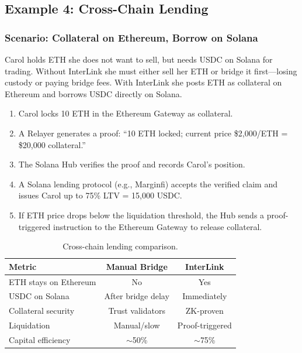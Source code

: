 \documentclass[11pt,a4paper]{article}
\begin{document}
\subsection{Example 4: Cross-Chain Lending}

\subsubsection{Scenario: Collateral on Ethereum, Borrow on Solana}

Carol holds ETH she does not want to sell, but needs USDC on Solana for trading. Without InterLink she must either sell her ETH or bridge it first---losing custody or paying bridge fees. With InterLink she posts ETH as collateral on Ethereum and borrows USDC directly on Solana.

\begin{enumerate}
    \item Carol locks 10 ETH in the Ethereum Gateway as collateral.
    \item A Relayer generates a proof: ``10 ETH locked; current price \$2,000/ETH = \$20,000 collateral.''
    \item The Solana Hub verifies the proof and records Carol's position.
    \item A Solana lending protocol (e.g., Marginfi) accepts the verified claim and issues Carol up to 75\% LTV = 15,000 USDC.
    \item If ETH price drops below the liquidation threshold, the Hub sends a proof-triggered instruction to the Ethereum Gateway to release collateral.
\end{enumerate}

\begin{table}[H]
\centering
\begin{tabular}{@{}lcc@{}}
\toprule
\textbf{Metric} & \textbf{Manual Bridge} & \textbf{InterLink} \\
\midrule
ETH stays on Ethereum & No & Yes \\
USDC on Solana & After bridge delay & Immediately \\
Collateral security & Trust validators & ZK-proven \\
Liquidation & Manual/slow & Proof-triggered \\
Capital efficiency & $\sim$50\% & $\sim$75\% \\
\bottomrule
\end{tabular}
\caption{Cross-chain lending comparison.}
\end{table}
\end{document}

